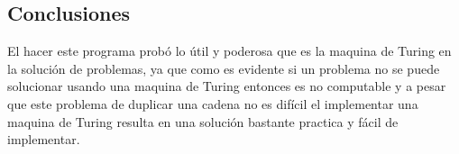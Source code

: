 \subsection{Conclusiones}
El hacer este programa probó lo útil y poderosa que es la maquina de Turing en la solución de problemas, ya que como es evidente si un problema no se puede solucionar usando una maquina de Turing entonces es no computable y a pesar que este problema de duplicar una cadena no es difícil el implementar una maquina de Turing resulta en una solución bastante practica y fácil de implementar.
